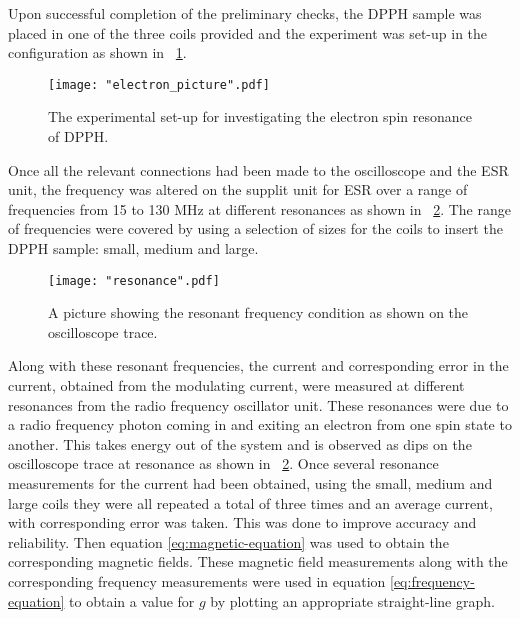 \documentclass{article}
\newcommand{\figref}[2][\figurename~]{#1\ref{#2}}
\begin{document}
\vspace{2mm}
\noindent
Upon successful completion of the preliminary checks, the DPPH sample was placed in one of the three coils provided and the experiment was set-up in the configuration as shown in \figref{fig:electron_picture}. 

\begin{figure}[h]
\centering
\texttt{[image: "electron\_picture".pdf]}
\caption{The experimental set-up for investigating the electron spin resonance of DPPH.}
\label{fig:electron_picture}
\end{figure}

\newpage
\vspace{2mm}
\noindent
Once all the relevant connections had been made to the oscilloscope and the ESR unit, the frequency was altered on the supplit unit for ESR over a range of frequencies from 15 to 130 MHz \cite{Paper02} at different resonances as shown in \figref{fig:resonance}. The range of frequencies were covered by using a selection of sizes for the coils to insert the DPPH sample: small, medium and large.

\begin{figure}[h]
\centering
\texttt{[image: "resonance".pdf]}
\caption{A picture showing the resonant frequency condition as shown on the oscilloscope trace.}
\label{fig:resonance}
\end{figure}


\vspace{2mm}
\noindent
Along with these resonant frequencies, the current and corresponding error in the current, obtained from the modulating current, were measured at different resonances from the radio frequency oscillator unit. These resonances were due to a radio frequency photon coming in and exiting an electron from one spin state to another. This takes energy out of the system and is observed as dips on the oscilloscope trace at resonance as shown in \figref{fig:resonance}. Once several resonance measurements for the current had been obtained, using the small, medium and large coils they were all repeated a total of three times and an average current, with corresponding error was taken. This was done to improve accuracy and reliability. Then equation \eqref{eq:magnetic-equation} was used to obtain the corresponding magnetic fields. These magnetic field measurements along with the corresponding frequency measurements were used in equation \eqref{eq:frequency-equation} to obtain a value for $g$ by plotting an appropriate straight-line graph. 
\end{document}
